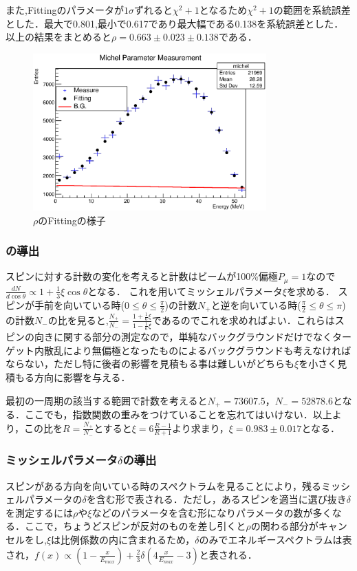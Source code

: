 また,Fittingのパラメータが$1\sigma$ずれると$\chi^2+1$となるため$\chi^2+1$の範囲を系統誤差とした．最大で0.801,最小で0.617であり最大幅である0.138を系統誤差とした．以上の結果をまとめると$\rho=0.663\pm0.023\pm0.138$である．

\begin{figure}[bht]
  \centering
  \includegraphics[width=0.8\textwidth]{figure/hatano/rho.eps}
  \caption{$\rho$のFittingの様子}
  \label{hatano_fig:rho}
\end{figure}

\subsubsection{の導出}
スピンに対する計数の変化を考えると計数はビームが100\%偏極$P_{\mu}=1$なので$\frac{dN}{d\cos\theta}\propto 1+\frac{1}{3}\xi\cos\theta$となる．
これを用いてミッシェルパラメータ$\xi$を求める．
スピンが手前を向いている時($0\leq\theta\leq\frac{\pi}{2}$)の計数$N_+$と逆を向いている時($\frac{\pi}{2}\leq\theta\leq\pi$)の計数$N_-$の比を見ると,$\frac{N_+}{N_-}=\frac{1+\frac{1}{6}\xi}{1-\frac{1}{6}\xi}$であるのでこれを求めればよい．これらはスピンの向きに関する部分の測定なので，単純なバックグラウンドだけでなくターゲット内散乱により無偏極となったものによるバックグラウンドも考えなければならない，ただし特に後者の影響を見積もる事は難しいがどちらも$\xi$を小さく見積もる方向に影響を与える．

最初の一周期の該当する範囲で計数を考えると$N_+=73607.5$，$N_-=52878.6$となる．ここでも，指数関数の重みをつけていることを忘れてはいけない．以上より，この比を$R=\frac{N_+}{N_-}$とすると$\xi=6\frac{R-1}{R+1}$より求まり，$\xi=0.983\pm0.017$となる．


\subsubsection{ミッシェルパラメータ$\delta$の導出}
スピンがある方向を向いている時のスペクトラムを見ることにより，残るミッシェルパラメータの$\delta$を含む形で表される．ただし，あるスピンを適当に選び抜き$\delta$を測定するには$\rho$や$\xi$などのパラメータを含む形になりパラメータの数が多くなる．ここで，ちょうどスピンが反対のものを差し引くと$\rho$の関わる部分がキャンセルをし,$\xi$は比例係数の内に含まれるため，$\delta$のみでエネルギースペクトラムは表され，$f(x)\propto(1-\frac{x}{E_{max}})+\frac{2}{3}\delta(4\frac{x}{E_{max}}-3)$と表される．

